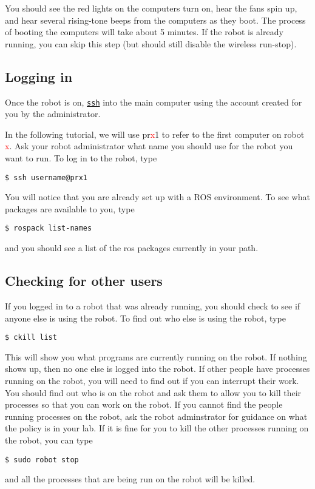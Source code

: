 You should see the red lights on the computers turn on, hear the fans spin up, and hear several rising-tone beeps from the computers 
as they boot.  The process of booting the computers will take about 5 minutes.  If the robot is already running, you can 
skip this step (but should still disable the wireless run-stop).
\subsection{Logging in}
Once the robot is on, \texttt{\href{http://unixhelp.ed.ac.uk/CGI/man-cgi?ssh}{ssh}} into the main computer using the account 
created for you by the administrator. 

In the following tutorial, we will use pr\textcolor{red}{x}1 to refer to the first computer on robot \textcolor{red}{x}.  
Ask your robot  administrator what name you should use for the robot you want to run. To log in to the robot, type
\begin{verbatim}
$ ssh username@prx1
\end{verbatim}
You will notice that you are already set up with a ROS environment.  To see what packages are available to you, type
\begin{verbatim}
$ rospack list-names
\end{verbatim}
and you should see a list of the ros packages currently in your path.

\subsection{Checking for other users}
If you logged in to a robot that was already running, you should check to see if anyone else is using the robot. To 
find out who else is using the robot, type
\begin{verbatim}
$ ckill list
\end{verbatim}
This will show you what programs are currently running on the robot.  If nothing shows up, then no one else is logged into the robot. If other people have processes running on the 
robot, you will need to find out if you can interrupt their work. You should find out who is on the robot and ask them 
to allow you to kill their processes so that you can work on the robot.  If you cannot find the people running processes 
on the robot, ask the robot adminstrator for guidance on what the policy is in your lab. If it is fine for you to kill 
the other processes running on the robot, you can type
\begin{verbatim}
$ sudo robot stop
\end{verbatim}
and all the processes that are being run on the robot will be killed.

